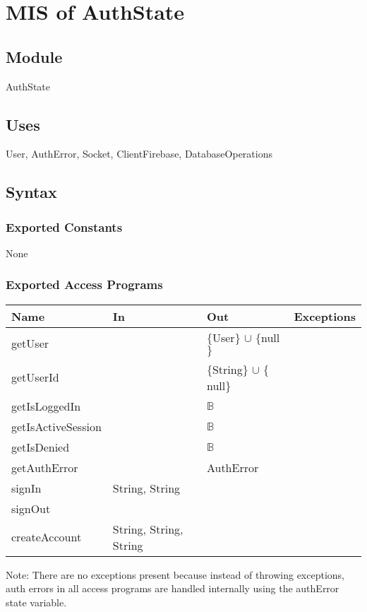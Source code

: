 \documentclass[12pt, titlepage]{article}
\begin{document}
\section{MIS of AuthState} \label{AuthState} 

\subsection{Module}

AuthState

\subsection{Uses}

User, AuthError, Socket, ClientFirebase, DatabaseOperations

\subsection{Syntax}

\subsubsection{Exported Constants}
None
\subsubsection{Exported Access Programs}

\begin{center}
\begin{tabular}{p{4cm} p{4cm} p{4cm} p{2cm}}
\hline
\textbf{Name} & \textbf{In} & \textbf{Out} & \textbf{Exceptions} \\
\hline
getUser &  & $\{$User$\}$ $\cup$ $\{$null$\}$ &  \\ \hline
getUserId &  & $\{$String$\}$ $\cup$ $\{$null$\}$ &  \\ \hline
getIsLoggedIn &  & $\mathbb{B}$ &  \\ \hline
getIsActiveSession &  & $\mathbb{B}$ &  \\ \hline
getIsDenied &  & $\mathbb{B}$ &  \\ \hline
getAuthError &  & AuthError &  \\ \hline
signIn & String, String &  &  \\ \hline
signOut & &  &  \\ \hline
createAccount & String, String, String &  &  \\ \hline
\end{tabular}
\end{center}
Note: There are no exceptions present because instead of throwing exceptions, auth errors in all access programs are handled internally using the authError state variable.
\end{document}
